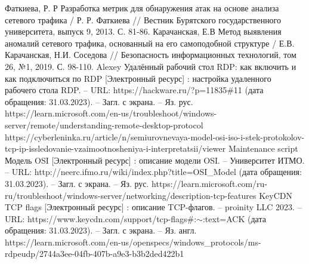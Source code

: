 \documentclass[bachelor, och, coursework]{SCWorks}
\begin{document}
  \begin{thebibliography}{15}
    Фаткиева, Р. Р Разработка метрик для обнаружения атак на основе анализа сетевого трафика / Р. Р. Фаткиева // Вестник Бурятского государственного университета, выпуск 9, 2013. С. 81-86.
    Карачанская, Е.В Метод выявления аномалий сетевого трафика, основанный на его самоподобной структуре / Е.В. Карачанская, Н.И. Соседова // Безопасность информационных технологий, том 26, №1, 2019. С. 98-110.
    Alexey Удалённый рабочий стол RDP: как включить и как подключиться по RDP [Электронный ресурс] : настройка удаленного рабочего стола RDP. -- URL: https://hackware.ru/?p=11835\#11 (дата обращения: 31.03.2023). -- Загл. с экрана. -- Яз. рус.
    https://learn.microsoft.com/en-us/troubleshoot/windows-server/remote/understanding-remote-desktop-protocol
    https://cyberleninka.ru/article/n/semiurovnevaya-model-osi-iso-i-stek-protokolov-tcp-ip-issledovanie-vzaimootnosheniya-i-interpretatsii/viewer
    Maintenance script Модель OSI [Электронный ресурс] : описание модели OSI. -- Университет ИТМО. -- URL: http://neerc.ifmo.ru/wiki/index.php?title=OSI_Model (дата обращения: 31.03.2023). -- Загл. с экрана. --  Яз. рус.
    https://learn.microsoft.com/ru-ru/troubleshoot/windows-server/networking/description-tcp-features
    KeyCDN TCP flags [Электронный ресурс] : описание TCP-флагов. -- proinity LLC 2023. -- URL: https://www.keycdn.com/support/tcp-flags\#:$\sim$:text=ACK (дата обращения: 31.03.2023). -- Загл. с экрана. --  Яз. англ.
    https://learn.microsoft.com/en-us/openspecs/windows_protocols/ms-rdpeudp/2744a3ee-04fb-407b-a9e3-b3b2ded422b1

\end{thebibliography}
\end{document}
